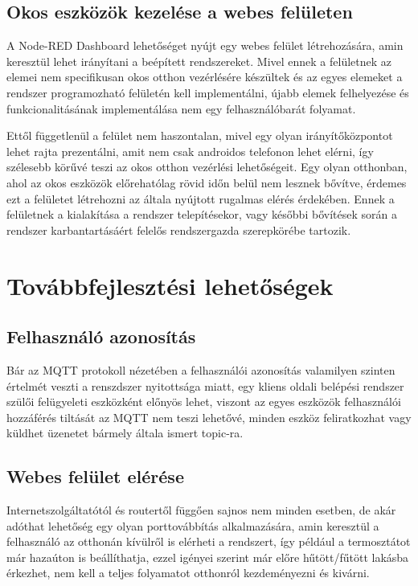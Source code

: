 \documentclass[
]{thesis-ekf}
\theoremstyle{definition}
\theoremstyle{remark}
\begin{document}
\section{Okos eszközök kezelése a webes felületen}
A Node-RED Dashboard lehetőséget nyújt egy webes felület létrehozására, amin keresztül lehet irányítani a beépített
rendszereket. Mivel ennek a felületnek az elemei nem specifikusan okos otthon vezérlésére készültek és az egyes
elemeket a rendszer programozható felületén kell implementálni, újabb elemek felhelyezése és funkcionalitásának
implementálása nem egy felhasználóbarát folyamat.

Ettől függetlenül a felület nem haszontalan, mivel egy olyan irányítőközpontot lehet rajta prezentálni, amit nem csak
androidos telefonon lehet elérni, így szélesebb körűvé teszi az okos otthon vezérlési lehetőségeit. Egy olyan otthonban,
ahol az okos eszközök előrehatólag rövid időn belül nem lesznek bővítve, érdemes ezt a felületet létrehozni az
általa nyújtott rugalmas elérés érdekében. Ennek a felületnek a kialakítása a rendszer telepítésekor, vagy későbbi
bővítések során a rendszer karbantartásáért felelős rendszergazda szerepkörébe tartozik.

\chapter{Továbbfejlesztési lehetőségek}
\section{Felhasználó azonosítás}
Bár az MQTT protokoll nézetében a felhasználói azonosítás valamilyen szinten értelmét veszti
a renszdszer nyitottsága miatt, egy kliens oldali belépési rendszer szülői felügyeleti
eszközként előnyös lehet, viszont az egyes eszközök felhasználói hozzáférés tiltását az MQTT
nem teszi lehetővé, minden eszköz feliratkozhat vagy küldhet üzenetet bármely általa ismert
topic-ra.

\section{Webes felület elérése}
Internetszolgáltatótól és routertől függően sajnos nem minden esetben, de akár adóthat lehetőség egy olyan
porttovábbítás alkalmazására, amin keresztül a felhasználó az otthonán kívülről is elérheti a rendszert,
így például a termosztátot már hazaúton is beállíthatja, ezzel igényei szerint már előre hűtött/fűtött lakásba
érkezhet, nem kell a teljes folyamatot otthonról kezdeményezni és kivárni.
\end{document}
